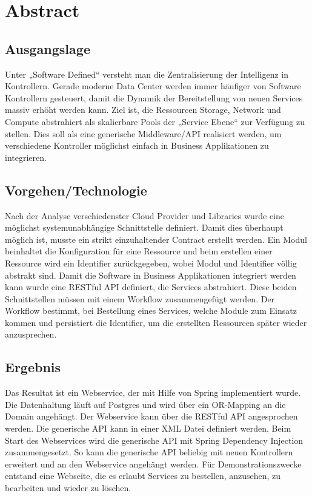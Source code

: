 \chapter*{Abstract}
\section*{Ausgangslage}
Unter „Software Defined“ versteht man die Zentralisierung der Intelligenz in Kontrollern. Gerade moderne Data Center werden immer häufiger von Software Kontrollern gesteuert, damit die Dynamik der Bereitstellung von neuen Services massiv erhöht werden kann. 
Ziel ist, die Ressourcen Storage, Network und Compute abstrahiert als skalierbare Pools der „Service Ebene“ zur Verfügung zu stellen. Dies soll als eine generische Middleware/\ac{API} realisiert werden, um verschiedene Kontroller möglichst einfach in Business Applikationen zu integrieren.

\section*{Vorgehen/Technologie}
Nach der Analyse verschiedenster Cloud Provider und Libraries wurde eine möglichst systemunabhängige Schnittstelle definiert. Damit dies überhaupt möglich ist, musste ein strikt einzuhaltender Contract erstellt werden. Ein Modul beinhaltet die Konfiguration für eine Ressource und beim erstellen einer Ressource wird ein Identifier zurückgegeben, wobei Modul und Identifier völlig abstrakt sind. Damit die Software in Business Applikationen integriert werden kann wurde eine RESTful API definiert, die Services abstrahiert. Diese beiden Schnittstellen müssen mit einem Workflow zusammengefügt werden. Der Workflow bestimmt, bei Bestellung eines Services,  welche Module zum Einsatz kommen und persistiert die Identifier, um die erstellten Ressourcen später wieder anzusprechen.

\section*{Ergebnis}
Das Resultat ist ein Webservice, der mit Hilfe von Spring implementiert wurde. Die Datenhaltung läuft auf Postgres und wird über ein OR-Mapping an die Domain angehängt. Der Webservice kann über die RESTful API angesprochen werden. Die generische API kann in einer \ac{XML} Datei definiert werden. Beim Start des Webservices wird die generische API mit Spring Dependency Injection zusammengesetzt. So kann die generische API beliebig mit neuen Kontrollern erweitert und an den Webservice angehängt werden. Für Demonstrationszwecke entstand eine Webseite, die es erlaubt Services zu bestellen, anzusehen, zu bearbeiten und wieder zu löschen.